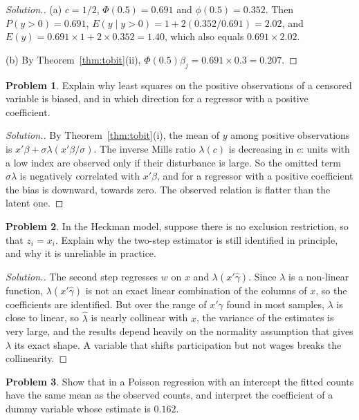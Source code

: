 \documentclass[11pt,a4paper]{article}
\numberwithin{equation}{section}
\theoremstyle{definition}
\newtheorem{problemx}{Problem}[subsection]
\newenvironment{problem}{\begin{problemx}}{\end{problemx}}
\newenvironment{solution}
  {\renewcommand{\qedsymbol}{}\begin{proof}[\textit{Solution}.]}
  {\end{proof}}
\begin{document}
\begin{solution}
(a) $c = 1/2$, $\Phi(0.5) = 0.691$ and $\phi(0.5) = 0.352$. Then $P(y > 0) = 0.691$, $E(y \mid y > 0) = 1 + 2(0.352/0.691) = 2.02$, and $E(y) = 0.691 \times 1 + 2 \times 0.352 = 1.40$, which also equals
$0.691 \times 2.02$.

(b) By Theorem~\ref{thm:tobit}(ii), $\Phi(0.5)\beta_j = 0.691 \times 0.3 = 0.207$.
\end{solution}

\begin{problem}
Explain why least squares on the positive observations of a censored variable is biased, and in which direction for a regressor with a positive
coefficient.
\end{problem}

\begin{solution}
By Theorem~\ref{thm:tobit}(i), the mean of $y$ among positive observations is $x'\beta + \sigma\lambda(x'\beta/\sigma)$. The inverse Mills ratio $\lambda(c)$ is decreasing in $c$: units with a low index
are observed only if their disturbance is large. So the omitted term $\sigma\lambda$ is negatively correlated with $x'\beta$, and for a regressor with a positive
coefficient the bias is downward, towards zero. The observed relation is flatter than the latent one.
\end{solution}

\begin{problem}
In the Heckman model, suppose there is no exclusion restriction, so that $z_i = x_i$. Explain why the two-step estimator is still identified in principle,
and why it is unreliable in practice.
\end{problem}

\begin{solution}
The second step regresses $w$ on $x$ and $\lambda(x'\hat\gamma)$. Since $\lambda$ is a non-linear function, $\lambda(x'\hat\gamma)$ is not an exact linear combination of the columns of $x$, so the
coefficients are identified. But over the range of $x'\gamma$ found in most samples, $\lambda$ is close to linear, so $\hat\lambda$ is nearly collinear with $x$, the variance of the
estimates is very large, and the results depend heavily on the normality assumption that gives $\lambda$ its exact shape. A variable that shifts
participation but not wages breaks the collinearity.
\end{solution}

\begin{problem}
Show that in a Poisson regression with an intercept the fitted counts have the same mean as the observed counts, and interpret the coefficient
of a dummy variable whose estimate is $0.162$.
\end{problem}
\end{document}
